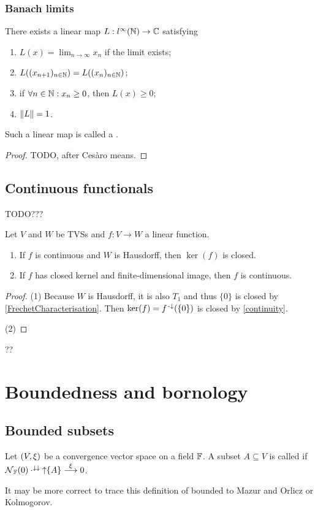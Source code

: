 \subsection{Banach limits}
\begin{proposition}
There exists a linear map $L:l^\infty(\mathbb{N}) \to \mathbb{C}$ satisfying
\begin{enumerate}
\item $\displaystyle L(x) = \lim_{n\to \infty}x_n$ if the limit exists;
\item $L((x_{n+1})_{n\in\mathbb{N}}) = L((x_n)_{n\in\mathbb{N}})$;
\item if $\forall n\in\mathbb{N}:x_n\geq 0$, then $L(x) \geq 0$;
\item $\lVert L\rVert = 1$.
\end{enumerate}
Such a linear map is called a .
\end{proposition}
\begin{proof}
TODO, after Cesàro means.
\end{proof}

\section{Continuous functionals}

TODO???
\begin{proposition}
Let $V$ and $W$ be TVSs and $f: V\to W$ a linear function.
\begin{enumerate}
\item If $f$ is continuous and $W$ is Hausdorff, then $\ker(f)$ is closed.
\item If $f$ has closed kernel and finite-dimensional image, then $f$ is continuous.
\end{enumerate}
\end{proposition}
\begin{proof}
(1) Because $W$ is Hausdorff, it is also $T_1$ and thus $\{0\}$ is closed by \ref{FrechetCharacterisation}. Then $\ker(f) = f^{{\text{\hspace{0.15em}-}\downarrow}}(\{0\})$ is closed by \ref{continuity}.

(2) 
\end{proof}
??

\chapter{Boundedness and bornology}
\section{Bounded subsets}
\begin{definition}
Let $\left( V,\xi \right)$ be a convergence vector space on a field $\mathbb{F}$. A subset $A\subseteq V$ is called  if $\operatorname{\mathcal{N}}_{\mathbb{F}}(0) \cdot^{\downarrow\downarrow} \operatorname{\uparrow}\{A\} \overset{\xi}{\longrightarrow} 0$.
\end{definition}
It may be more correct to trace this definition of bounded to Mazur and Orlicz or Kolmogorov.

